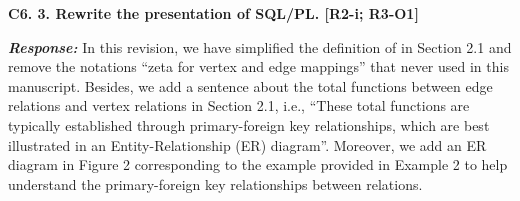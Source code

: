 \textbf{
C6. 3. Rewrite the presentation of SQL/PL. [R2-i; R3-O1]
}

\textbf{\textit{Response: }}
In this revision, we have simplified the definition of \rgmapping in Section 2.1 and remove the notations ``zeta for vertex and edge mappings'' that never used in this manuscript.
Besides, we add a sentence about the total functions between edge relations and vertex relations in Section 2.1, i.e., ``These total functions are typically established through primary-foreign key relationships, which are best illustrated in an Entity-Relationship (ER) diagram''.
Moreover, we add an ER diagram in Figure 2 corresponding to the example provided in Example 2 to help understand the primary-foreign key relationships between relations.